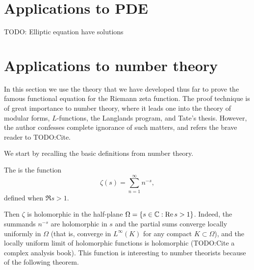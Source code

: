 \section{Applications to PDE}
TODO: Elliptic equation have solutions

\section{Applications to number theory}
In this section we use the theory that we have developed thus far to prove the famous functional equation for the Riemann zeta function.
The proof technique is of great importance to number theory, where it leads one into the theory of modular forms, $L$-functions, the Langlands program, and Tate's thesis.
However, the author confesses complete ignorance of such matters, and refers the brave reader to TODO:Cite.

We start by recalling the basic definitions from number theory.
\begin{definition}
The  is the function
\[\zeta(s) = \sum_{n=1}^{\infty} n^{-s},\]
defined when $\Re s > 1$.
\end{definition}
Then $\zeta$ is holomorphic in the half-plane $\Omega = \{s \in \mathbb{C}: \operatorname{Re} s > 1\}$.
Indeed, the summands $n^{-s}$ are holomorphic in $s$ and the partial sums converge locally uniformly in $\Omega$ (that is, converge in $L^\infty(K)$ for any compact $K \subset \Omega$), and the locally uniform limit of holomorphic functions is holomorphic (TODO:Cite a complex analysis book).
This function is interesting to number theorists because of the following theorem.


